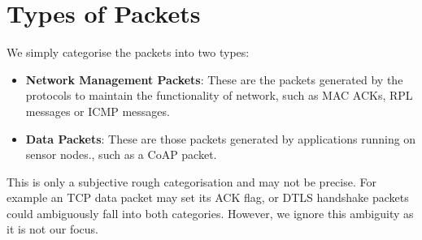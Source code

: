 \section{Types of Packets}
We simply categorise the packets into two types:
\begin{itemize}
\item {\bf Network Management Packets}: These are the packets generated by the protocols to  maintain the functionality of network, such as MAC ACKs, RPL messages or ICMP messages.
\item {\bf Data Packets}: These are those packets generated by applications running on sensor nodes., such as a CoAP packet.
\end{itemize}

This is only a subjective rough categorisation and may not be precise. For example an TCP data packet may set its ACK flag, or DTLS handshake packets could ambiguously fall into both categories. However, we ignore this ambiguity as it is not our focus.